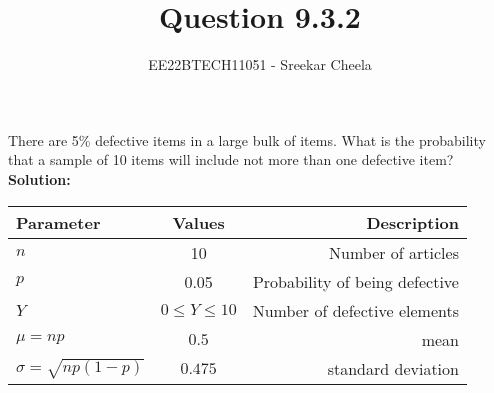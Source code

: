 \documentclass[journal,12pt,onecolumn]{IEEEtran}
\begin{document}
\newcommand{\solution}{\noindent \textbf{Solution: }}
\newcommand{\cosec}{\,\text{cosec}\,}
\providecommand{\dec}[2]{\ensuremath{\overset{#1}{\underset{#2}{\gtrless}}}}
\newcommand{\myvec}[1]{\ensuremath{\begin{pmatrix}#1\end{pmatrix}}}
\newcommand{\mydet}[1]{\ensuremath{\begin{vmatrix}#1\end{vmatrix}}}
\newcommand{\myaugvec}[2]{\ensuremath{\begin{amatrix}{#1}#2\end{amatrix}}}
\providecommand{\rank}{\text{rank}}
\providecommand{\pr}[1]{\ensuremath{\Pr\left(#1\right)}}
\providecommand{\qfunc}[1]{\ensuremath{Q\left(#1\right)}}
	\newcommand*{\permcomb}[4][0mu]{{{}^{#3}\mkern#1#2_{#4}}}
\newcommand*{\perm}[1][-3mu]{\permcomb[#1]{P}}
\newcommand*{\comb}[1][-1mu]{\permcomb[#1]{C}}
\providecommand{\qfunc}[1]{\ensuremath{Q\left(#1\right)}}
\providecommand{\gauss}[2]{\mathcal{N}\ensuremath{\left(#1,#2\right)}}
\providecommand{\diff}[2]{\ensuremath{\frac{d{#1}}{d{#2}}}}
\providecommand{\myceil}[1]{\left \lceil #1 \right \rceil }
\newcommand\figref{Fig.~\ref}
\newcommand\tabref{Table~\ref}
\newcommand{\sinc}{\,\text{sinc}\,}
\newcommand{\rect}{\,\text{rect}\,}
\let\vec\mathbf
\vspace{3cm}
\title{
  Question 9.3.2
}
\author{EE22BTECH11051 - Sreekar Cheela}
\maketitle
There are 5\% defective items in a large bulk of items. What is the probability that a sample of 10 items will include not more than one defective item?\\
\solution\\
\begin{table}[h!]
    \begin{center}
       \begin{tabular}{|l|c|r|}
       \hline
       Parameter & Values & Description\\
       \hline
       $n$ & 10 & Number of articles\\
       \hline
       $p$ & 0.05 & Probability of being defective\\
       \hline
       $Y$ & $0\leq Y \leq 10$
       &  Number of defective elements\\
       \hline
       $\mu=np$ & $0.5$ & mean\\
       \hline
       $\sigma=\sqrt{np(1-p)}$ & $0.475$ & standard deviation\\
       \hline
       \end{tabular}
       \end{center}
   \end{table}
\end{document}
